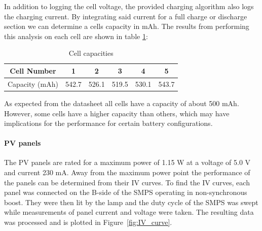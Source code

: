 \documentclass[a4paper]{article}
\begin{document}
In addition to logging the cell voltage, the provided charging algorithm also 
logs the charging current. By integrating said current for a full charge or 
discharge section we can determine a cells capacity in mAh. The results from 
performing this analysis on each cell are shown in table \ref{table:1}:

\vspace{5pt}
\begin{table}[h!]
    \centering
    \begin{tabular}{||c| c c c c c||} 
        \hline
        Cell Number& 1 & 2 & 3 & 4 & 5 \\ [0.5ex] 
        \hline
        Capacity (mAh) & 542.7	& 526.1	& 519.5	& 530.1	& 543.7\\ [1ex] 
        \hline
    \end{tabular}
    \caption{Cell capacities}
    \label{table:1}
\end{table}

As expected from the datasheet\cite{batteryDatasheet} all cells have a capacity of about 500 mAh. However, some cells 
have a higher capacity than others, which may have implications for the 
performance for certain battery configurations.

\paragraph*{PV panels}
The PV panels are rated for a maximum power of 1.15 W at a voltage of 
5.0 V and current 230 mA. Away from the maximum power point the performance 
of the panels can be determined from their IV curves. To find the IV 
curves, each panel was connected on the B-side of the SMPS operating 
in non-synchronous boost. They were then lit by the lamp and the duty 
cycle of the SMPS was swept while measurements of panel current and 
voltage were taken. The resulting data was processed and is plotted 
in Figure~\ref{fig:IV_curve}.
\end{document}
